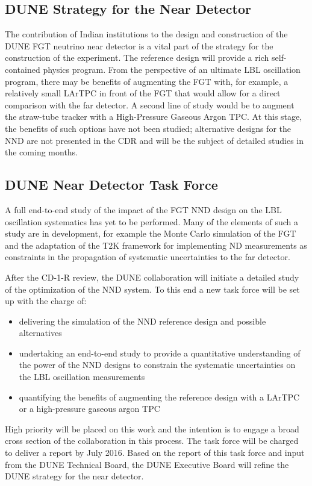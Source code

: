 \subsection{DUNE Strategy for the Near Detector}

The contribution of Indian institutions to the design and construction of the DUNE 
FGT neutrino near detector is a vital part of the strategy for the construction 
of the experiment. The reference design will provide a rich self-contained physics 
program. From the perspective of an ultimate LBL oscillation program, there may 
be benefits of augmenting the FGT with, for example, a relatively small LArTPC 
in front of the FGT that would allow for a direct comparison with the far detector. 
A second line of study would be to augment the straw-tube tracker  with 
a High-Pressure Gaseous Argon TPC. At this stage, the benefits of such options 
have not been studied; alternative designs for the NND are not presented in 
the CDR and will be the subject of detailed studies in the coming months. 

\subsection{DUNE Near Detector Task Force}

A full end-to-end study of the impact of the FGT NND design on the LBL oscillation 
systematics has yet to be performed. Many of the elements of such a study are in 
development, for example the Monte Carlo simulation of the FGT and the adaptation 
of the T2K framework for implementing ND measurements as constraints in the propagation 
of systematic uncertainties to the far detector. 

After the CD-1-R review, the DUNE collaboration will initiate a detailed study 
of the optimization of the NND system. To this end a new task force will be set 
up with the charge of:

\begin{itemize}
\item delivering the simulation of the NND reference design and possible alternatives

\item undertaking an end-to-end study to provide a quantitative understanding of 
the power of the NND designs to constrain the systematic uncertainties on the LBL 
oscillation measurements

\item quantifying the benefits of augmenting the reference design with a LArTPC 
or a high-pressure gaseous argon TPC
\end{itemize}

High priority will be placed on this work and the intention is to engage a broad 
cross section of the collaboration in this process. The task force will be charged 
to deliver a report by July 2016. Based on the report of this task force and input 
from the DUNE Technical Board, the DUNE Executive Board will refine the DUNE strategy 
for the near detector.



